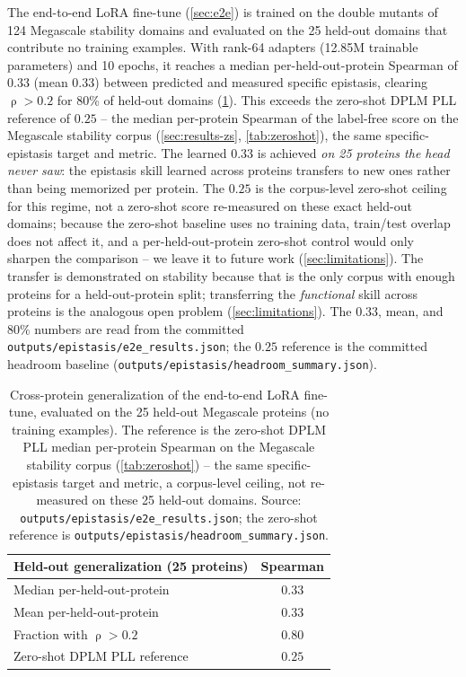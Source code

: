 \documentclass{article}
\DeclareMathOperator{\spearman}{\rho}
\begin{document}
The end-to-end LoRA fine-tune (\cref{sec:e2e}) is trained on the double mutants of
124 Megascale stability domains and evaluated on the 25 held-out domains that
contribute no training examples. With rank-64 adapters (12.85M trainable
parameters) and 10 epochs, it reaches a median per-held-out-protein Spearman of
$0.33$ (mean $0.33$) between predicted and measured specific epistasis, clearing
$\spearman > 0.2$ for 80\% of held-out domains (\cref{tab:e2e}). This exceeds the
zero-shot DPLM PLL reference of $0.25$ -- the median per-protein Spearman of the
label-free score on the Megascale stability corpus (\cref{sec:results-zs},
\cref{tab:zeroshot}), the same specific-epistasis target and metric. The learned
$0.33$ is achieved \emph{on 25 proteins the head never saw}: the epistasis skill
learned across proteins transfers to new ones rather than being memorized per
protein. The $0.25$ is the corpus-level zero-shot ceiling for this regime, not a
zero-shot score re-measured on these exact held-out domains; because the zero-shot
baseline uses no training data, train/test overlap does not affect it, and a
per-held-out-protein zero-shot control would only sharpen the comparison -- we leave
it to future work (\cref{sec:limitations}). The transfer is demonstrated on
stability because that is the only corpus with enough proteins for a
held-out-protein split; transferring the \emph{functional} skill across proteins is
the analogous open problem (\cref{sec:limitations}). The $0.33$, mean, and $80\%$
numbers are read from the committed \texttt{outputs/epistasis/e2e\_results.json}; the
$0.25$ reference is the committed headroom baseline
(\texttt{outputs/epistasis/headroom\_summary.json}).

\begin{table}[t]
  \centering
  \caption{Cross-protein generalization of the end-to-end LoRA fine-tune,
  evaluated on the 25 held-out Megascale proteins (no training examples).
  The reference is the zero-shot DPLM PLL median per-protein Spearman on the
  Megascale stability corpus (\cref{tab:zeroshot}) -- the same specific-epistasis
  target and metric, a corpus-level ceiling, not re-measured on these 25 held-out
  domains. Source: \texttt{outputs/epistasis/e2e\_results.json}; the zero-shot
  reference is \texttt{outputs/epistasis/headroom\_summary.json}.}
  \label{tab:e2e}
  \begin{tabular}{lc}
    \toprule
    Held-out generalization (25 proteins) & Spearman \\
    \midrule
    Median per-held-out-protein   & $0.33$ \\
    Mean per-held-out-protein     & $0.33$ \\
    Fraction with $\spearman>0.2$ & $0.80$ \\
    \midrule
    Zero-shot DPLM PLL reference  & $0.25$ \\
    \bottomrule
  \end{tabular}
\end{table}
\end{document}
